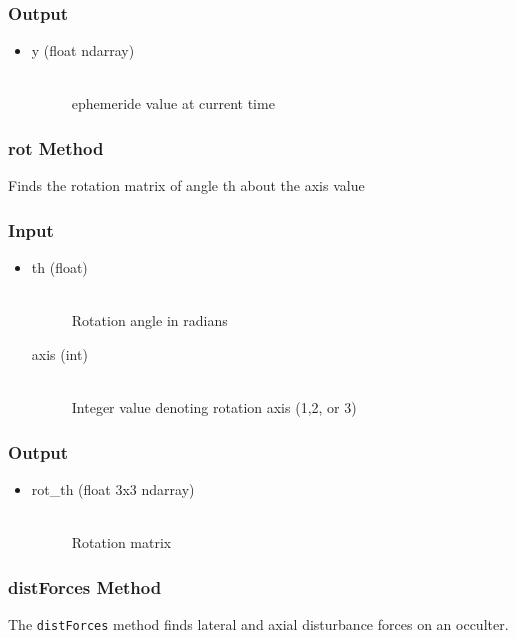 \documentclass[cleanfoot]{asme2ej}
\begin{document}
\subsubsection*{Output}
\begin{itemize}
\item
\begin{description}
    \item[y (float ndarray)] \hfill \\ ephemeride value at current time
\end{description}
\end{itemize}

\subsubsection{rot Method} \label{}
Finds the rotation matrix of angle th about the axis value
\subsubsection*{Input}
\begin{itemize}
\item
\begin{description}
    \item[th (float)] \hfill \\ Rotation angle in radians
    \item[axis (int)] \hfill \\ Integer value denoting rotation axis (1,2, or 3)
\end{description}
\end{itemize}
\subsubsection*{Output}
\begin{itemize}
\item
\begin{description}
    \item[rot\_th (float 3x3 ndarray)] \hfill \\ Rotation matrix
\end{description}
\end{itemize}

\subsubsection{distForces Method} \label{sec:distforcestask} 
The \verb+distForces+ method finds lateral and axial disturbance forces on an occulter.
\end{document}
